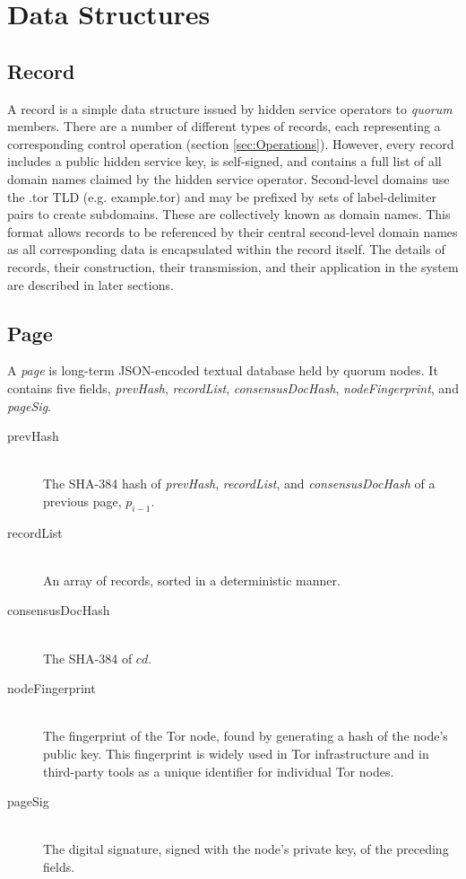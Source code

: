 \section{Data Structures}

\subsection{Record}

A record is a simple data structure issued by hidden service operators to \emph{quorum} members. There are a number of different types of records, each representing a corresponding control operation (section \ref{sec:Operations}). However, every record includes a public hidden service key, is self-signed, and contains a full list of all domain names claimed by the hidden service operator. Second-level domains use the .tor TLD (e.g. example.tor) and may be prefixed by sets of label-delimiter pairs to create subdomains. These are collectively known as domain names. This format allows records to be referenced by their central second-level domain names as all corresponding data is encapsulated within the record itself. The details of records, their construction, their transmission, and their application in the system are described in later sections.

\subsection{Page}
\label{sec:Page}

A \emph{page} is long-term JSON-encoded textual database held by quorum nodes. It contains five fields, \emph{prevHash}, \emph{recordList}, \emph{consensusDocHash}, \emph{nodeFingerprint}, and \emph{pageSig}. 

\begin{description}
	\item[prevHash] \hfill \\
		The SHA-384 hash of \emph{prevHash}, \emph{recordList}, and \emph{consensusDocHash} of a previous page, $ p_{i - 1} $.
	\item[recordList] \hfill \\
		An array of records, sorted in a deterministic manner.
	\item[consensusDocHash] \hfill \\
		The SHA-384 of $ cd $.
	\item[nodeFingerprint] \hfill \\
		The fingerprint of the Tor node, found by generating a hash of the node's public key. This fingerprint is widely used in Tor infrastructure and in third-party tools as a unique identifier for individual Tor nodes.
	\item[pageSig] \hfill \\
		The digital signature, signed with the node's private key, of the preceding fields.
\end{description}

